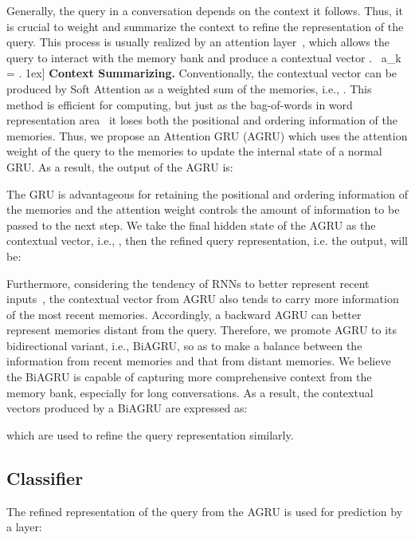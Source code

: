 \documentclass[letterpaper]{article} \usepackage{aaai20}  \usepackage{times}  \usepackage{helvet} \usepackage{courier}  \usepackage[hyphens]{url}  \usepackage{graphicx} \urlstyle{rm} \def\UrlFont{\rm}  \usepackage{graphicx}  \frenchspacing  \setlength{\pdfpagewidth}{8.5in}  \setlength{\pdfpageheight}{11in}
\begin{document}
Generally, the query in a conversation depends on the context it follows. Thus, it is crucial to weight and summarize the context to refine the representation of the query. This process is usually realized by an attention layer~\cite{DBLP:conf/emnlp/HazarikaPMCZ18,DBLP:conf/naacl/HazarikaPZCMZ18}, which allows the query to interact with the memory bank and produce a contextual vector .
\
    a_k = .
1ex]
\noindent\textbf{Context Summarizing.}
Conventionally, the contextual vector  can be produced by Soft Attention as a weighted sum of the memories, i.e., . This method is efficient for computing, but just as the bag-of-words in word representation area~\cite{DBLP:conf/nips/MikolovSCCD13,DBLP:conf/emnlp/LingTAFDBTL15} it loses both the positional and ordering information of the memories. Thus, we propose an Attention GRU (AGRU) which uses the attention weight of the query to the memories to update the internal state  of a normal GRU. As a result, the output of the AGRU is:

The GRU is advantageous for retaining the positional and ordering information of the memories and the attention weight controls the amount of information to be passed to the next step. We take the final hidden state of the AGRU as the contextual vector, i.e., , then the refined query representation, i.e. the output, will be: 


Furthermore, considering the tendency of RNNs to better represent recent inputs~\cite{DBLP:journals/corr/BahdanauCB14}, the contextual vector from AGRU also tends to carry more information of the most recent memories. Accordingly, a backward AGRU can better represent memories distant from the query. Therefore, we promote AGRU to its bidirectional variant, i.e., BiAGRU, so as to make a balance between the information from recent memories and that from distant memories. We believe the BiAGRU is capable of capturing more comprehensive context from the memory bank, especially for long conversations. As a result, the contextual vectors produced by a BiAGRU are expressed as:

which are used to refine the query representation similarly.


\subsection{Classifier}

The refined representation of the query from the AGRU is used for prediction by a  layer:
\end{document}
